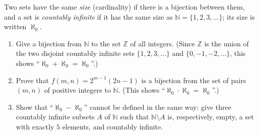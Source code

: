 Two sets have the same \emph{size} (cardinality) if there is a bijection between them, and a set is \emph{countably infinite} if it has the same size as $\mathbb N=\{1,2,3,\dots\}$; its size is written $\aleph_0$.
\begin{enumerate}
\item[(a)] Give a bijection from $\mathbb N$ to the set $\mathbb Z$ of all integers. (Since $\mathbb Z$ is the union of the two disjoint countably infinite sets $\{1,2,3,\dots\}$ and $\{0,-1,-2,\dots\}$, this shows ``$\aleph_0+\aleph_0=\aleph_0$''.)
\item[(b)] Prove that $f(m,n)=2^{m-1}(2n-1)$ is a bijection from the set of pairs $(m,n)$ of positive integers to $\mathbb N$. (This shows ``$\aleph_0\cdot\aleph_0=\aleph_0$''.)
\item[(c)] Show that ``$\aleph_0-\aleph_0$'' cannot be defined in the same way: give three countably infinite subsets $A$ of $\mathbb N$ such that $\mathbb N\setminus A$ is, respectively, empty, a set with exactly $5$ elements, and countably infinite.
\end{enumerate}

